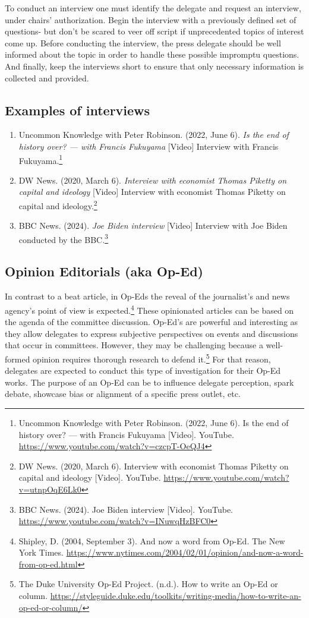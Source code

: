 To conduct an interview one must identify the delegate and request an interview, under chairs' authorization. Begin the interview with a previously defined set of questions- but don’t be scared to veer off script if unprecedented topics of interest come up. Before conducting the interview, the press delegate should be well informed about the topic in order to handle these possible impromptu questions. And finally, keep the interviews short to ensure that only necessary information is collected and provided.

\subsection{Examples of interviews}

\begin{enumerate}
  \item Uncommon Knowledge with Peter Robinson. (2022, June 6). \emph{Is the end of history over? — with Francis Fukuyama} [Video] Interview with Francis Fukuyama.\footnote{Uncommon Knowledge with Peter Robinson. (2022, June 6). Is the end of history over? — with Francis Fukuyama [Video]. YouTube. \url{https://www.youtube.com/watch?v=czcpT-OeQJ4}}
  \item DW News. (2020, March 6). \emph{Interview with economist Thomas Piketty on capital and ideology} [Video] Interview with economist Thomas Piketty on capital and ideology.\footnote{DW News. (2020, March 6). Interview with economist Thomas Piketty on capital and ideology [Video]. YouTube. \url{https://www.youtube.com/watch?v=utnpOqE6Lk0}}
  \item BBC News. (2024). \emph{Joe Biden interview} [Video] Interview with Joe Biden conducted by the BBC.\footnote{BBC News. (2024). Joe Biden interview [Video]. YouTube. \url{https://www.youtube.com/watch?v=INuwqHzBFC0}}
\end{enumerate}

\subsection{Opinion Editorials (aka Op-Ed)}

In contrast to a beat article, in Op-Eds the reveal of the journalist’s and news agency’s point of view is expected.\footnote{Shipley, D. (2004, September 3). And now a word from Op-Ed. The New York Times. \url{https://www.nytimes.com/2004/02/01/opinion/and-now-a-word-from-op-ed.html}} These opinionated articles can be based on the agenda of the committee discussion. Op-Ed’s are powerful and interesting as they allow delegates to express subjective perspectives on events and discussions that occur in committees. However, they may be challenging because a well-formed opinion requires thorough research to defend it.\footnote{The Duke University Op-Ed Project. (n.d.). How to write an Op-Ed or column. \url{https://styleguide.duke.edu/toolkits/writing-media/how-to-write-an-op-ed-or-column/}} For that reason, delegates are expected to conduct this type of investigation for their Op-Ed works. The purpose of an Op-Ed can be to influence delegate perception, spark debate, showcase bias or alignment of a specific press outlet, etc.

